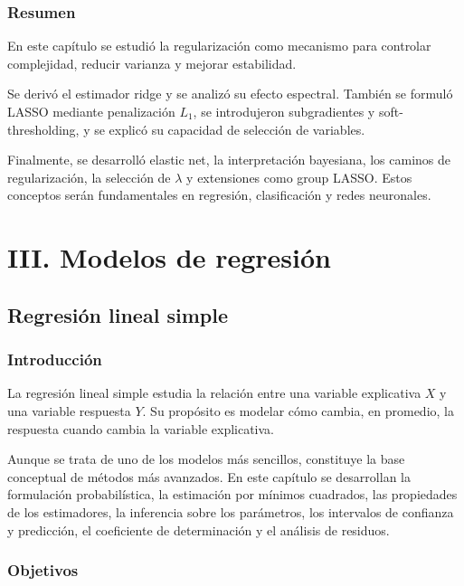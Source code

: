 \documentclass[
  spanish,
  11pt,
  letterpaper,
  DIV=11,
  numbers=noendperiod]{scrreprt}
\theoremstyle{definition}
\theoremstyle{plain}
\theoremstyle{definition}
\theoremstyle{remark}
\begin{document}
\section{Resumen}\label{resumen-7}

En este capítulo se estudió la regularización como mecanismo para
controlar complejidad, reducir varianza y mejorar estabilidad.

Se derivó el estimador ridge y se analizó su efecto espectral. También
se formuló LASSO mediante penalización \(L_1\), se introdujeron
subgradientes y soft-thresholding, y se explicó su capacidad de
selección de variables.

Finalmente, se desarrolló elastic net, la interpretación bayesiana, los
caminos de regularización, la selección de \(\lambda\) y extensiones
como group LASSO. Estos conceptos serán fundamentales en regresión,
clasificación y redes neuronales.

\part{III. Modelos de regresión}

\chapter{Regresión lineal simple}\label{sec-regresion-lineal-simple}

\section{Introducción}\label{introducciuxf3n-9}

La regresión lineal simple estudia la relación entre una variable
explicativa \(X\) y una variable respuesta \(Y\). Su propósito es
modelar cómo cambia, en promedio, la respuesta cuando cambia la variable
explicativa.

Aunque se trata de uno de los modelos más sencillos, constituye la base
conceptual de métodos más avanzados. En este capítulo se desarrollan la
formulación probabilística, la estimación por mínimos cuadrados, las
propiedades de los estimadores, la inferencia sobre los parámetros, los
intervalos de confianza y predicción, el coeficiente de determinación y
el análisis de residuos.

\section{Objetivos}\label{objetivos-8}
\end{document}
